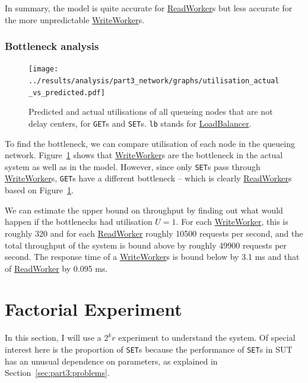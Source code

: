 \documentclass[11pt]{article}
\newcommand{\get}[0]{\texttt{GET}}
\newcommand{\set}[0]{\texttt{SET}}
\newcommand{\linkmain}[1]{\href{https://gitlab.inf.ethz.ch/pungast/asl-fall16-project/blob/master/src/main/java/asl/#1.java}{#1}}
\begin{document}
In summary, the model is quite accurate for \linkmain{ReadWorker}s but less accurate for the more unpredictable \linkmain{WriteWorker}s.


\subsubsection{Bottleneck analysis}

\begin{figure}[h]
\centering
\texttt{[image: ../results/analysis/part3\_network/graphs/utilisation\_actual\_vs\_predicted.pdf]}
\caption{Predicted and actual utilisations of all queueing nodes that are not delay centers, for \get{}s and \set{}s. \texttt{lb} stands for \linkmain{LoadBalancer}.}
\label{fig:part3:utilisation}
\end{figure}

To find the bottleneck, we can compare utilisation of each node in the queueing network. Figure~\ref{fig:part3:utilisation} shows that \linkmain{WriteWorker}s are the bottleneck in the actual system as well as in the model. However, since only \set{}s pass through \linkmain{WriteWorker}s, \get{}s have a different bottleneck -- which is clearly \linkmain{ReadWorker}s based on Figure~\ref{fig:part3:utilisation}.

We can estimate the upper bound on throughput by finding out what would happen if the bottlenecks had utilisation $U=1$. For each \linkmain{WriteWorker}, this is roughly 320 and for each \linkmain{ReadWorker} roughly 10500 requests per second, and the total throughput of the system is bound above by roughly 49900 requests per second. The response time of a \linkmain{WriteWorker}s is bound below by 3.1 ms and that of \linkmain{ReadWorker} by 0.095 ms.




\clearpage
\section{Factorial Experiment}\label{sec:part4-2k-experiment}

In this section, I will use a $2^kr$ experiment to understand the system. Of special interest here is the proportion of \set{}s because the performance of \set{}s in SUT has an unusual dependence on parameters, as explained in Section~\ref{sec:part3:problems}.
\end{document}
